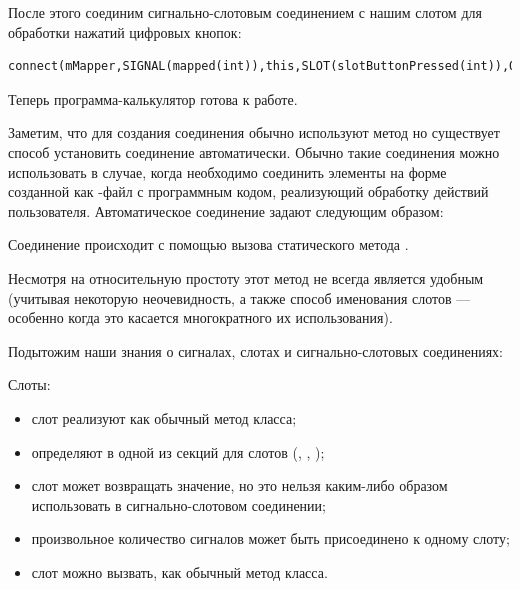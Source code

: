 После этого соединим  сигнально-слотовым соединением с нашим слотом для обработки
нажатий цифровых кнопок:
\begin{lstlisting}
connect(mMapper,SIGNAL(mapped(int)),this,SLOT(slotButtonPressed(int)),Qt::UniqueConnection);
\end{lstlisting}

Теперь программа-калькулятор готова к работе.

Заметим, что для создания соединения обычно используют метод  но существует способ установить
соединение автоматически. Обычно такие соединения можно
использовать в случае, когда необходимо соединить элементы на форме созданной как -файл с программным кодом,
реализующий обработку действий пользователя. Автоматическое соединение задают следующим образом:

Соединение происходит с помощью вызова статического метода .

Несмотря на относительную простоту этот метод не всегда является удобным (учитывая некоторую неочевидность, а также
способ именования слотов --- особенно когда это касается многократного их использования).

Подытожим наши знания о сигналах, слотах и сигнально-слотовых соединениях:

Слоты:
\begin{itemize}
\item слот реализуют как обычный метод класса;
\item определяют в одной из секций для слотов (, , );
\item слот может возвращать значение, но это нельзя каким-либо образом использовать в сигнально-слотовом соединении;
\item произвольное количество сигналов может быть присоединено к одному слоту;
\item слот можно вызвать, как обычный метод класса.
\end{itemize}

